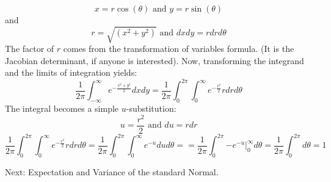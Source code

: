 \documentclass[12pt]{article} %
\begin{document}
$$x= r\cos(\theta) \textrm{ and } y= r\sin(\theta)$$
and
$$r = \sqrt{(x^2+y^2)} \textrm{ and } dxdy = r dr d\theta$$
The factor of $r$ comes from the transformation of variables formula. (It is the Jacobian determinant, if anyone is interested). Now, transforming the integrand and the limits of integration yields:
$$ \frac1{{2\pi}} \int_{-\infty}^{\infty} e^{-\frac{x^2+y^2}2} dx dy =  \frac1{{2\pi}} \int_{0}^{2\pi}  \int_{0}^{\infty} e^{-\frac{r^2}2} r dr d\theta$$
The integral becomes a simple $u$-substitution:
$$ u = \frac{r^2}2 \textrm{ and } du = r dr$$
$$ \frac1{{2\pi}} \int_{0}^{2\pi}  \int_{0}^{\infty} e^{-\frac{r^2}2} r dr d\theta =  \frac1{{2\pi}} \int_{0}^{2\pi}  \int_{0}^{\infty} e^{-u} du d\theta = =  \frac1{{2\pi}} \int_{0}^{2\pi}  \left.-e^{-u}\right\rvert_0^{\infty} d\theta =  \frac1{{2\pi}} \int_{0}^{2\pi} d\theta = 1$$

Next: Expectation and Variance of the standard Normal.
\end{document}
